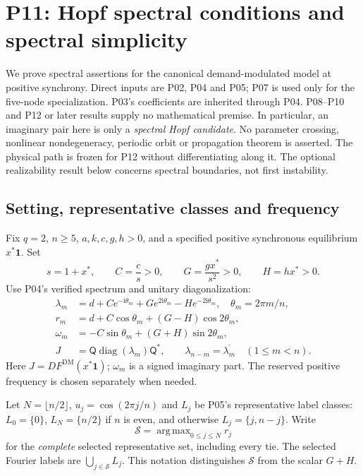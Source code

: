 \documentclass[11pt]{article}
\newcommand{\one}{\mathbf{1}}
\newcommand{\ii}{\mathrm{i}}
\newcommand{\DM}{\mathrm{DM}}
\newcommand{\Fourier}{\mathsf{Q}}
\DeclareMathOperator{\diag}{diag}
\DeclareMathOperator*{\argmax}{arg\,max}
\theoremstyle{definition}
\theoremstyle{remark}
\begin{document}
\section{P11: Hopf spectral conditions and spectral simplicity}
\label{sec:P11}
We prove spectral assertions for the canonical demand-modulated model at
positive synchrony. Direct inputs are P02, P04 and P05; P07 is used only
for the five-node specialization. P03's coefficients are inherited through
P04. P08--P10 and P12 or later results supply no mathematical premise.
In particular, an imaginary pair here is only a \emph{spectral Hopf
candidate}. No parameter crossing, nonlinear nondegeneracy, periodic
orbit or propagation theorem is asserted. The physical path is frozen for
P12 without differentiating along it. The optional realizability result
below concerns spectral boundaries, not first instability.

\subsection{Setting, representative classes and frequency}
\label{slot:P11-1}
Fix $q=2$, $n\ge5$, $a,k,c,g,h>0$, and a specified positive synchronous
equilibrium $x^*\one$. Set
\begin{equation}
 s=1+x^*,\qquad C=\frac cs>0,\qquad
 G=\frac{gx^*}{s^2}>0,\qquad H=hx^*>0.
 \label{eq:P11-effective}
\end{equation}
Use P04's verified spectrum and unitary diagonalization:
\begin{align}
 \lambda_m&=d+Ce^{-\ii\theta_m}+Ge^{2\ii\theta_m}
                       -He^{-2\ii\theta_m},\quad \theta_m=2\pi m/n,
                       \label{eq:P11-input}\\
 r_m&=d+C\cos\theta_m+(G-H)\cos2\theta_m,\nonumber\\
 \omega_m&=-C\sin\theta_m+(G+H)\sin2\theta_m,\nonumber\\
 J&=\Fourier\diag(\lambda_m)\Fourier^*,\qquad
 \lambda_{n-m}=\overline{\lambda_m}\quad(1\le m<n).\nonumber
\end{align}
Here $J=DF^{\DM}(x^*\one)$; $\omega_m$ is a signed imaginary part.
The reserved positive frequency is chosen separately when needed.

Let $N=\lfloor n/2\rfloor$, $u_j=\cos(2\pi j/n)$ and
$L_j$ be P05's representative label classes: $L_0=\{0\}$,
$L_N=\{n/2\}$ if $n$ is even, and otherwise
$L_j=\{j,n-j\}$. Write
\[
 \mathcal S=\argmax_{0\le j\le N}r_j
\]
for the \emph{complete} selected representative set, including every tie.
The selected Fourier labels are $\bigcup_{j\in\mathcal S}L_j$.
This notation distinguishes $\mathcal S$ from the scalar $G+H$.
\end{document}
